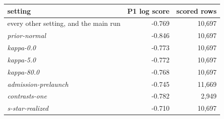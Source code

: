 \begin{tabular}{lrr}
\toprule
setting & P1 log score & scored rows \\
\midrule
every other setting, and the main run & -0.769 & 10,697 \\
\midrule
\emph{prior-normal} & -0.846 & 10,697 \\
\emph{kappa-0.0} & -0.773 & 10,697 \\
\emph{kappa-5.0} & -0.772 & 10,697 \\
\emph{kappa-80.0} & -0.768 & 10,697 \\
\emph{admission-prelaunch} & -0.745 & 11,669 \\
\emph{contrasts-one} & -0.782 & 2,949 \\
\emph{s-star-realized} & -0.710 & 10,697 \\

\end{tabular}
